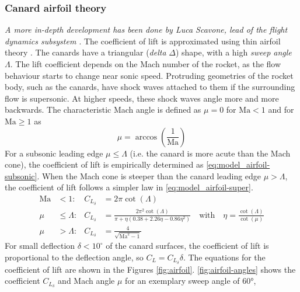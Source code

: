 \subsubsection{Canard airfoil theory}
\textit{A more in-depth development has been done by Luca Scavone, lead of the flight dynamics subsystem \cite{team-flight-luca}}.
The coefficient of lift is approximated using thin airfoil theory \cite{stengel2004}.
The canards have a triangular (\textit{delta} $\Delta$) shape, with a high \textit{sweep angle} $\Lambda$. 
The lift coefficient depends on the Mach number of the rocket, as the flow behaviour starts to change near sonic speed.
Protruding geometries of the rocket body, such as the canards, have shock waves attached to them if the surrounding flow is supersonic.
At higher speeds, these shock waves angle more and more backwards. 
The characteristic Mach angle is defined as $\mu = 0$ for $\mathrm{Ma} < 1$ and for $\mathrm{Ma} \geq 1$ as \cite{stengel2004}
\begin{equation}
    \mu = \arccos(\frac{1}{\mathrm{Ma}})
\end{equation}
For a subsonic leading edge $\mu \leq \Lambda$ (i.e. the canard is more acute than the Mach cone), the coefficient of lift is empirically determined \cite{stengel2004} as \autoref{eq:model_airfoil-subsonic}.
When the Mach cone is steeper than the canard leading edge $\mu > \Lambda$, the coefficient of lift follows a simpler law \cite{stengel2004} in \autoref{eq:model_airfoil-super}.
\begin{align}
    \mathrm{Ma} &<  1: & C_{L_\delta} &= 2 \pi\cot(\Lambda)
    \\
    \mu &\leq \Lambda : & C_{L_\delta} &= \frac{2 \pi^2 \cot(\Lambda)}{\pi + \eta (0.38 + 2.26 \eta - 0.86 \eta^2)} \quad \text{with} \quad \eta = \frac{\cot(\Lambda)}{\cot(\mu)} \label{eq:model_airfoil-subsonic} 
    \\
    \mu &> \Lambda : &C_{L_\delta} &= \frac{4}{\sqrt{\mathrm{Ma}^2-1}} \label{eq:model_airfoil-super}
\end{align}
For small deflection $\delta < 10^\circ$ of the canard surfaces, the coefficient of lift is proportional to the deflection angle, so $C_L = C_{L_\delta} \delta$.
The equations for the coefficient of lift are shown in the Figures \ref{fig:airfoil}.
\autoref{fig:airfoil-angles} shows the coefficient $C_{L_\delta}$ and Mach angle $\mu$ for an exemplary sweep angle of 60°, 

